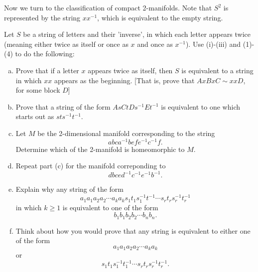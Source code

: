 \documentclass[a4paper, 12pt]{article}
\begin{document}
\begin{problem}{7}
Now we turn to the classification of compact 2-manifolds. Note that \(S^2\) is represented by the string \(xx^{-1}\), which is equivalent to the empty string.

Let \(S\) be a string of letters and their 'inverse', in which each letter appears twice (meaning either twice as itself or once as \(x\) and once as \(x^{-1}\)). Use (i)-(iii) and (1)-(4) to do the following:
\begin{enumerate}[(a)]
\item Prove that if a letter \(x\) appears twice as itself, then \(S\) is equivalent to a string in which \(xx\) appears as the beginning. [That is, prove that \(AxBxC\sim xxD\), for some block \(D\)]
\item Prove that a string of the form \(AsCtDs^{-1}Et^{-1}\) is equivalent to one which starts out as \(sts^{-1}t^{-1}\).
\item Let \(M\) be the 2-dimensional manifold corresponding to the string 
\[abca^{-1}befe^{-1}c^{-1}f.\]
Determine which of the 2-manifold is homeomorphic to \(M\).
\item Repeat part (c) for the manifold correponding to 
\[dbced^{-1}c^{-1}e^{-1}b^{-1}.\]
\item Explain why any string of the form 
\[a_1a_1a_2a_2\cdots a_ka_ks_1t_1s_1^{-1}t^{-1}\cdots s_rt_rs_r^{-1}t_r^{-1}\]
in which \(k\geq 1\) is equivalent to one of the form 
\[b_1b_1b_2b_2\cdots b_nb_n.\]
\item Think about how you would prove that any string is equivalent to either one of the form 
\[a_1a_1a_2a_2\cdots a_ka_k\]
or 
\[s_1t_1s_1^{-1}t_1^{-1}\cdots s_rt_rs_r^{-1}t_r^{-1}.\]
\end{enumerate}
\end{problem}
\end{document}
